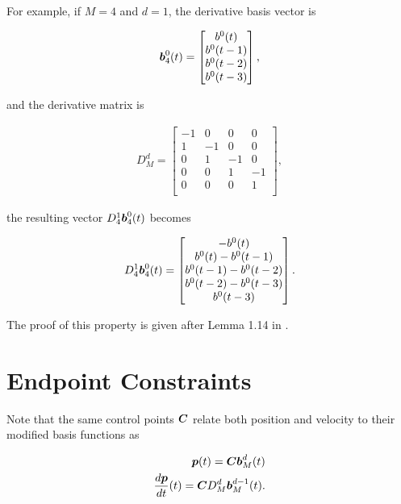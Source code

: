 For example, if $M=4$ and $d=1$, the derivative basis vector is

\begin{align}
    \boldsymbol{b}^0_4(t) =
    \begin{bmatrix}
        b^0(t)\\
        b^0(t-1)\\
        b^0(t-2)\\
        b^0(t-3)\\
    \end{bmatrix},
\end{align}

and the derivative matrix is

\begin{align}
    D_M^d =
    \begin{bmatrix}
        -1 & 0 & 0 & 0\\
        1 & -1 & 0 & 0\\
        0 & 1 & -1 & 0\\
        0 & 0 & 1 & -1\\
        0 & 0 & 0 & 1\\
    \end{bmatrix},
\end{align}

the resulting vector $D_4^1 \boldsymbol{b}^0_4(t)$ becomes

\begin{align}
    D_4^1 \boldsymbol{b}^0_4(t) = 
    \begin{bmatrix}
        -b^0(t)\\
        b^0(t) - b^0(t-1)\\
        b^0(t-1) - b^0(t-2)\\
        b^0(t-2) - b^0(t-3)\\
        b^0(t-3)\\
    \end{bmatrix}.
\end{align}

The proof of this property is given after Lemma 1.14 in \cite{beard2025BSplines}.

\section{Endpoint Constraints}

Note that the same control points $\boldsymbol{C}$ relate both position and velocity to their modified basis functions as

\begin{align}
    \boldsymbol{p}(t) = \boldsymbol{C} \boldsymbol{b}^d_M(t)\\
    \frac{d\boldsymbol{p}}{dt}(t) = \boldsymbol{C} D_M^{d} \boldsymbol{b}_M^{d-1}(t).
\end{align}

